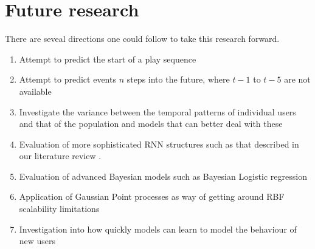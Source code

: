\section{Future research}

There are seveal directions one could follow to take this research forward.
\begin{enumerate}
	\item Attempt to predict the start of a play sequence
	\item Attempt to predict events $n$ steps into the future, where $t-1$ to $t-5$ are not available
	\item Investigate the variance between the temporal patterns of individual users and that of the population and models that can better deal with these
	\item Evaluation of more sophisticated RNN structures such as that described in our literature review \parencite{xiao2017modeling}.
	\item Evaluation of advanced Bayesian models such as Bayesian Logistic regression
	\item Application of Gaussian Point processes as way of getting around RBF scalability limitations
	\item Investigation into how quickly models can learn to model the behaviour of new users
\end{enumerate}
